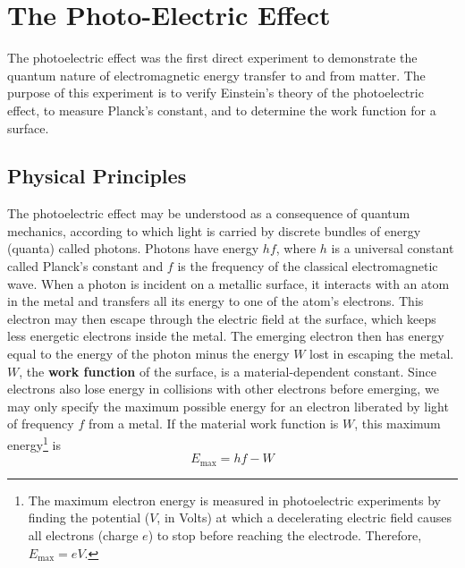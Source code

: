 \chapter{The Photo-Electric Effect}
The photoelectric effect was the first direct experiment to demonstrate the quantum nature of electromagnetic energy transfer to and from matter. The purpose of this experiment is to verify Einstein's theory of the photoelectric effect, to measure Planck's constant, and to determine the work function for a surface.

\section{Physical Principles}
The photoelectric effect may be understood as a consequence of quantum mechanics, according to which light is carried by discrete bundles of energy (quanta) called photons.
Photons have energy $hf$, where $h$ is a universal constant called Planck's constant and $f$ is the frequency of the classical electromagnetic wave. When a photon is incident on a metallic surface, it interacts with an atom in the metal and transfers all its energy to one of the atom's electrons. This electron may then escape through the electric field at the surface, which keeps less energetic electrons inside the metal. The emerging electron then has energy equal to the energy of the photon minus the energy $W$ lost in escaping the metal. $W$, the \textbf{work function} of the surface, is a material-dependent constant. Since electrons also lose energy in collisions with other electrons before emerging, we may only specify the maximum possible energy for an electron liberated by light of frequency $f$ from a metal. If the material work function is $W$, this maximum energy\footnote{The maximum electron energy is measured in photoelectric experiments by finding the potential ($V$, in Volts) at which a decelerating electric field causes all electrons (charge $e$) to stop before reaching the electrode. Therefore, $E_{\mathrm{max}}=eV$.} is
\begin{equation}
  E_{\mathrm{max}}=hf-W
  \label{eq:emax}
\end{equation}

